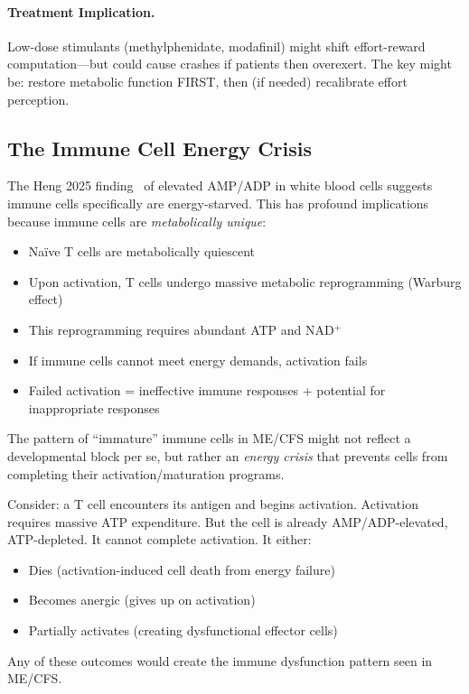 \paragraph{Treatment Implication.} Low-dose stimulants (methylphenidate, modafinil) might shift effort-reward computation---but could cause crashes if patients then overexert. The key might be: restore metabolic function FIRST, then (if needed) recalibrate effort perception.

\subsection{The Immune Cell Energy Crisis}

\begin{open_question}
The Heng 2025 finding~\cite{heng2025mecfs} of elevated AMP/ADP in white blood cells suggests immune cells specifically are energy-starved. This has profound implications because immune cells are \textit{metabolically unique}:

\begin{itemize}
    \item Na\"ive T cells are metabolically quiescent
    \item Upon activation, T cells undergo massive metabolic reprogramming (Warburg effect)
    \item This reprogramming requires abundant ATP and NAD$^+$
    \item If immune cells cannot meet energy demands, activation fails
    \item Failed activation = ineffective immune responses + potential for inappropriate responses
\end{itemize}

The pattern of ``immature'' immune cells in ME/CFS might not reflect a developmental block per se, but rather an \textit{energy crisis} that prevents cells from completing their activation/maturation programs.

Consider: a T cell encounters its antigen and begins activation. Activation requires massive ATP expenditure. But the cell is already AMP/ADP-elevated, ATP-depleted. It cannot complete activation. It either:
\begin{itemize}
    \item Dies (activation-induced cell death from energy failure)
    \item Becomes anergic (gives up on activation)
    \item Partially activates (creating dysfunctional effector cells)
\end{itemize}

Any of these outcomes would create the immune dysfunction pattern seen in ME/CFS.
\end{open_question}

